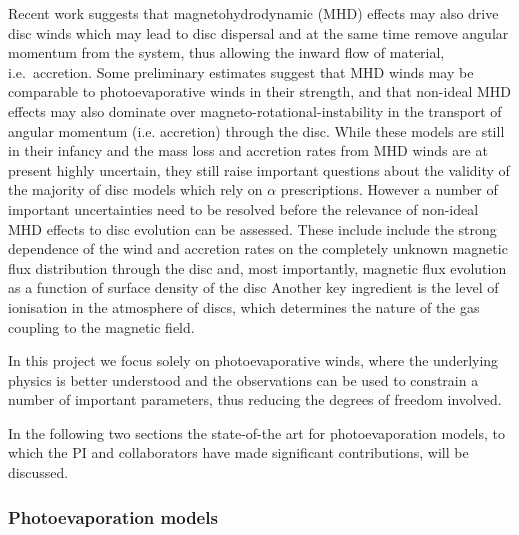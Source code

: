 \documentclass[10pt,fleqn,twoside]{article}
\begin{document}
Recent work suggests that magnetohydrodynamic (MHD) effects may also
drive disc winds 
\citep[e.g.,][]{2013ApJ...769...76B}
which may lead to disc
dispersal and at the same time remove angular momentum from the
system, thus allowing the inward flow of material, i.e.\ accretion. 
Some preliminary estimates suggest that MHD winds may be 
comparable to photoevaporative winds in their strength, and that
non-ideal MHD effects may also dominate over
magneto-rotational-instability  \citep[MRI, ]{1991ApJ...376..214B} in the transport of
angular momentum (i.e. accretion) through the disc. 
While these models are still in their infancy and the
mass loss and accretion rates from MHD winds are at present highly
uncertain, they still raise important questions about the validity of
the majority of 
disc models which rely on $\alpha$ prescriptions. However a number of
important uncertainties need to be resolved before the relevance of
non-ideal MHD effects to disc evolution can be assessed. These include
include the strong dependence of the wind and
accretion rates on the completely unknown magnetic flux distribution
through the disc and, most importantly, magnetic flux evolution as a
function of surface density of the disc 
\citep[e.g.\ discussion in][]{2013ApJ...778L..14A} 
Another key ingredient is the level of ionisation in the
atmosphere of discs, which determines the nature of the gas coupling to
the magnetic field. 

In this project we focus solely on photoevaporative winds, where the
underlying physics is better understood and the observations can be
used to constrain a number of important parameters, thus reducing the
degrees of freedom involved. 

In the following two sections the state-of-the art for photoevaporation
models, to which the PI and collaborators have made significant contributions, will be discussed.
 
\subsubsection{Photoevaporation models} 
\end{document}
